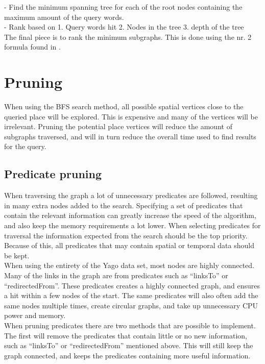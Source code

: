 - Find the minimum spanning tree for each of the root nodes containing the maximum amount of the query words.\\
- Rank based on 1. Query words hit 2. Nodes in the tree 3. depth of the tree\\
The final piece is to rank the minimum subgraphs. This is done using the nr. 2 formula found in \cite{Shi:2016:TRS:2882903.2882941}. 


\section{Pruning} \label{pruning}
When using the BFS search method, all possible spatial vertices close to the queried place will be explored. This is expensive and many of the vertices will be irrelevant. Pruning the potential place vertices will reduce the amount of subgraphs traversed, and will in turn reduce the overall time used to find results for the query.\\

\subsection{Predicate pruning}
When traversing the graph a lot of unnecessary predicates are followed, resulting in many extra nodes added to the search. Specifying a set of predicates that contain the relevant information can greatly increase the speed of the algorithm, and also keep the memory requirements a lot lower. When selecting predicates for traversal the information expected from the search should be the top priority. Because of this, all predicates that may contain spatial or temporal data should be kept.\\

When using the entirety of the Yago data set, most nodes are highly connected. Many of the links in the graph are from predicates such as ``linksTo'' or ``redirectedFrom''. These predicates creates a highly connected graph, and ensures a hit within a few nodes of the start. The same predicates will also often add the same nodes multiple times, create circular graphs, and take up unnecessary CPU power and memory.\\

When pruning predicates there are two methods that are possible to implement. The first will remove the predicates that contain little or no new information, such as ``linksTo'' or ``redirectedFrom'' mentioned above. This will still keep the graph connected, and keeps the predicates containing more useful information.\\

